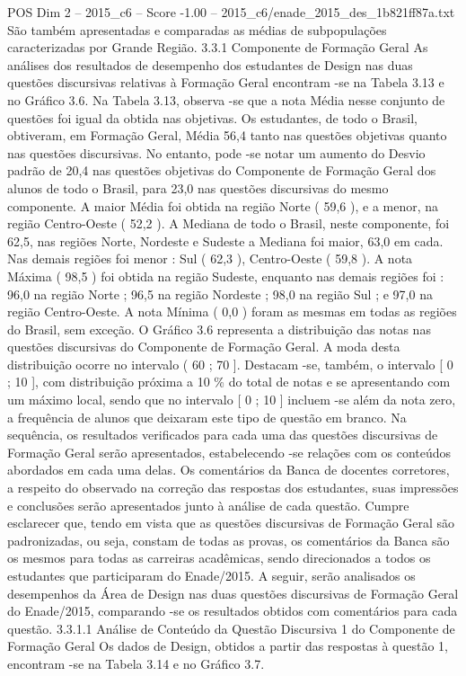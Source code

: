 \begin{textsample}{POS Dim 2 – 2015\_c6 – Score -1.00 – 2015\_c6/enade\_2015\_des\_1b821ff87a.txt}
São também apresentadas e comparadas as médias de subpopulações caracterizadas por Grande Região. 3.3.1 Componente de Formação Geral As análises dos resultados de desempenho dos estudantes de Design nas duas questões discursivas relativas à Formação Geral encontram -se na Tabela 3.13 e no Gráfico 3.6.
Na Tabela 3.13, observa -se que a nota Média nesse conjunto de questões foi igual da obtida nas objetivas.
Os estudantes, de todo o Brasil, obtiveram, em Formação Geral, Média 56,4 tanto nas questões objetivas quanto nas questões discursivas.
No entanto, pode -se notar um aumento do Desvio padrão de 20,4 nas questões objetivas do Componente de Formação Geral dos alunos de todo o Brasil, para 23,0 nas questões discursivas do mesmo componente.
A maior Média foi obtida na região Norte ( 59,6 ), e a menor, na região Centro-Oeste ( 52,2 ).
A Mediana de todo o Brasil, neste componente, foi 62,5, nas regiões Norte, Nordeste e Sudeste a Mediana foi maior, 63,0 em cada.
Nas demais regiões foi menor : Sul ( 62,3 ), Centro-Oeste ( 59,8 ).
A nota Máxima ( 98,5 ) foi obtida na região Sudeste, enquanto nas demais regiões foi : 96,0 na região Norte ; 96,5 na região Nordeste ; 98,0 na região Sul ; e 97,0 na região Centro-Oeste.
A nota Mínima ( 0,0 ) foram as mesmas em todas as regiões do Brasil, sem exceção.
O Gráfico 3.6 representa a distribuição das notas nas questões discursivas do Componente de Formação Geral.
A moda desta distribuição ocorre no intervalo ( 60 ; 70 ].
Destacam -se, também, o intervalo [ 0 ; 10 ], com distribuição próxima a 10 \% do total de notas e se apresentando com um máximo local, sendo que no intervalo [ 0 ; 10 ] incluem -se além da nota zero, a frequência de alunos que deixaram este tipo de questão em branco.
Na sequência, os resultados verificados para cada uma das questões discursivas de Formação Geral serão apresentados, estabelecendo -se relações com os conteúdos abordados em cada uma delas.
Os comentários da Banca de docentes corretores, a respeito do observado na correção das respostas dos estudantes, suas impressões e conclusões serão apresentados junto à análise de cada questão.
Cumpre esclarecer que, tendo em vista que as questões discursivas de Formação Geral são padronizadas, ou seja, constam de todas as provas, os comentários da Banca são os mesmos para todas as carreiras acadêmicas, sendo direcionados a todos os estudantes que participaram do Enade/2015.
A seguir, serão analisados os desempenhos da Área de Design nas duas questões discursivas de Formação Geral do Enade/2015, comparando -se os resultados obtidos com comentários para cada questão. 3.3.1.1 Análise de Conteúdo da Questão Discursiva 1 do Componente de Formação Geral Os dados de Design, obtidos a partir das respostas à questão 1, encontram -se na Tabela 3.14 e no Gráfico 3.7.

\end{textsample}
